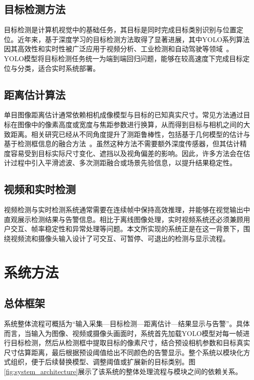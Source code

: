 \documentclass[12pt,a4paper]{article}
\begin{document}
\subsection{目标检测方法}
目标检测是计算机视觉中的基础任务，其目标是同时完成目标类别识别与位置定位。近年来，基于深度学习的目标检测方法取得了显著进展，其中YOLO系列算法因其高效性和实时性被广泛应用于视频分析、工业检测和自动驾驶等领域~\cite{redmon2016yolo,wang2024yolov10,jocher2023yolov8}。YOLO模型将目标检测任务统一为端到端回归问题，能够在较高速度下完成目标定位与分类，适合实时系统部署。

\subsection{距离估计算法}
单目图像距离估计通常依赖相机成像模型与目标的已知真实尺寸。常见方法通过目标在图像中的像素高度或宽度与焦距参数进行换算，从而得到目标与相机之间的大致距离。相关研究已经从不同角度提升了测距鲁棒性，包括基于几何模型的估计与基于检测框信息的融合方法~\cite{zhang2021review,wu2022vehicle}。虽然这种方法不需要额外深度传感器，但其估计精度容易受到目标实际尺寸变化、遮挡以及视角偏差的影响。因此，许多方法会在估计过程中引入平滑滤波、多次测距融合或场景先验信息，以提升结果稳定性。

\subsection{视频和实时检测}
视频检测与实时检测系统通常需要在连续帧中保持高效推理，并能够在视觉输出中直观展示检测结果与告警信息。相比于离线图像处理，实时视频系统还必须兼顾用户交互、帧率稳定性和异常处理等问题。本文所实现的系统正是在这一背景下，围绕视频流和摄像头输入设计了可交互、可暂停、可退出的检测与显示流程。

\section{系统方法}
\subsection{总体框架}
系统整体流程可概括为“输入采集—目标检测—距离估计—结果显示与告警”。具体而言，当输入为图像、视频或摄像头画面时，系统首先加载YOLO模型对每一帧进行目标检测，然后从检测框中提取目标的像素尺寸，结合预设相机参数和目标真实尺寸估算距离，最后根据预设阈值给出不同颜色的告警显示。整个系统以模块化方式组织，便于后续替换模型、调整阈值或扩展新的目标类别。图\ref{fig:system_architecture}展示了该系统的整体处理流程与模块之间的依赖关系。
\end{document}

